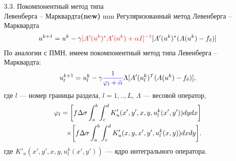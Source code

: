 \documentclass[10pt,pdf, mathserif, hyperref={unicode}]{beamer}
\begin{document}

\begin{frame}{3.3. Покомпонентный метод типа \\ Левенберга -- Марквардта\textbf{(new)}}
	 mm
	Регуляризованный метод Левенберга -- Марквардта %
	$$	u^{k+1}=u^k-\gamma{\color{red}[A'(u^k)^*A'(u^k)+\alpha I]^{-1} }[A'(u^k)^*(A(u^k)-f_\delta)]$$
	По аналогии с ПМН, имеем покомпонентный метод типа Левенберга -- Марквардта:
	$$ u_l^{k+1}=u_l^k-\gamma{\color{blue}\frac{1}{\varphi_l+\bar{\alpha}}}\Lambda[ A'(u_l^k)^T(A(u^k)-f_\delta)],$$
	где $l$ --- номер границы раздела, $l=1,..,L$, $\Lambda$ --- весовой оператор, 
	\begin{equation*}
	\begin{aligned}
	\varphi_l=\bigg[ f\Delta\sigma\int_{a}^{b}\int_{c}^{d}
	K'_u(x',y', x, y, u_l^k(x',y'))dydx\bigg] \notag \\ \times\bigg[f\Delta\sigma\int_{a}^{b}\int_{c}^{d}K'_u(x,y, x',y',u_l^k(x,y))dxdy\bigg]. 
	\end{aligned}
	\end{equation*} 
	где $K'_u(x',y', x, y, u_l^k(x',y'))$ --- ядро интегрального оператора. %
	\let\thefootnote\relax\let\thefootnote\relax{}

\end{frame}
\end{document}
